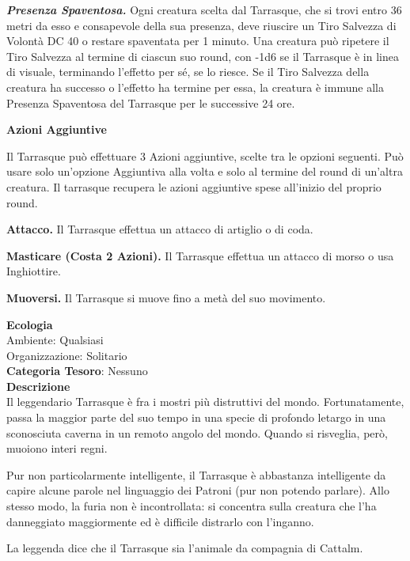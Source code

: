\begin{multicols}{2}
{\emph{\textbf{Presenza Spaventosa.}} Ogni creatura scelta dal Tarrasque, che si trovi entro 36 metri da esso e consapevole della sua presenza, deve riuscire un Tiro Salvezza di Volontà DC 40 o restare spaventata per 1 minuto. Una creatura può ripetere il Tiro Salvezza al termine di ciascun suo round, con -1d6 se il Tarrasque è in linea di visuale, terminando l'effetto per sé, se lo riesce. Se il Tiro Salvezza della creatura ha successo o l'effetto ha termine per essa, la creatura è immune alla Presenza Spaventosa del Tarrasque per le successive 24 ore.

\textbf{Azioni Aggiuntive}

Il Tarrasque può effettuare 3 Azioni aggiuntive, scelte tra le opzioni seguenti. Può usare solo un'opzione Aggiuntiva alla volta e solo al termine del round di un'altra creatura. Il tarrasque recupera le azioni aggiuntive spese all'inizio del proprio round.

\textbf{Attacco.} Il Tarrasque effettua un attacco di artiglio o di coda.

\textbf{Masticare (Costa 2 Azioni).} Il Tarrasque effettua un attacco di morso o usa Inghiottire.

\textbf{Muoversi.} Il Tarrasque si muove fino a metà del suo movimento.

\textbf{Ecologia}\\
Ambiente: Qualsiasi\\
Organizzazione: Solitario\\
\textbf{Categoria Tesoro}: Nessuno\\
\textbf{Descrizione}\\
Il leggendario Tarrasque è fra i mostri più distruttivi del mondo. Fortunatamente, passa la maggior parte del suo tempo in una specie di profondo letargo in una sconosciuta caverna in un remoto angolo del mondo. Quando si risveglia, però, muoiono interi regni.

Pur non particolarmente intelligente, il Tarrasque è abbastanza intelligente da capire alcune parole nel linguaggio dei Patroni (pur non potendo parlare). Allo stesso modo, la furia non è incontrollata: si concentra sulla creatura che l'ha danneggiato maggiormente ed è difficile distrarlo con l'inganno.

La leggenda dice che il Tarrasque sia l'animale da compagnia di Cattalm.

}
\end{multicols}
